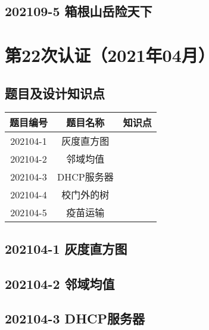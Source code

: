 \documentclass[cn,10pt,math=newtx,citestyle=gb7714-2015,bibstyle=gb7714-2015]{elegantbook}
\newif\ifonlyanalyze %
\begin{document}
\newpage
\section{202109-5 箱根山岳险天下}
\ifonlyanalyze
\else
  
\fi



\chapter{第22次认证（2021年04月）}

\section{题目及设计知识点}

\begin{table}[htbp]
  \centering
  \begin{tabular}{ccc}
    \toprule
    题目编号 & 题目名称   & 知识点 \\
    \midrule
    202104-1 & 灰度直方图 &        \\
    202104-2 & 邻域均值   &        \\
    202104-3 & DHCP服务器 &        \\
    202104-4 & 校门外的树 &        \\
    202104-5 & 疫苗运输   &        \\
    \bottomrule
  \end{tabular}
\end{table}

\newpage
\section{202104-1 灰度直方图}
\ifonlyanalyze
\else
  
\fi


\newpage
\section{202104-2 邻域均值}
\ifonlyanalyze
\else
  
\fi


\newpage
\section{202104-3 DHCP服务器}
\ifonlyanalyze
\else
  
\fi

\end{document}
